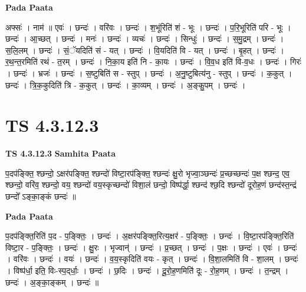 \documentclass[17pt]{extarticle}
\begin{document}
\textbf{Pada Paata} \newline

अफ्सः॑ । नाम॑ ॥ एवः॑ । छन्दः॑ । वरि॑वः । छन्दः॑ । श॒भूंरिति॑ शं - भूः । छन्दः॑ । प॒रि॒भूरिति॑ परि - भूः । छन्दः॑ । आ॒च्छत् । छन्दः॑ । मनः॑ । छन्दः॑ । व्यचः॑ । छन्दः॑ । सिन्धुः॑ । छन्दः॑ । स॒मु॒द्रम् । छन्दः॑ । स॒लि॒लम् । छन्दः॑ । सं॒ॅयदिति॑ सं - यत् । छन्दः॑ । वि॒यदिति॑ वि - यत् । छन्दः॑ । बृ॒हत् । छन्दः॑ । र॒थ॒न्त॒रमिति॑ रथं - त॒रम् । छन्दः॑ । नि॒का॒य इति॑ नि - का॒यः । छन्दः॑ । वि॒व॒ध इति॑ वि-व॒धः । छन्दः॑ । गिरः॑ । छन्दः॑ । भ्रजः॑ । छन्दः॑ । स॒ष्टुबिति॑ स - स्तुप् । छन्दः॑ । अ॒नु॒ष्टुबित्य॑नु - स्तुप् । छन्दः॑ । क॒कुत् । छन्दः॑ । त्रि॒क॒कुदिति॑ त्रि - क॒कुत् । छन्दः॑ । का॒व्यम् । छन्दः॑ । अ॒ङ्कु॒पम् । छन्दः॑ ।  \newline




\section*{ TS 4.3.12.3 }

\textbf{TS 4.3.12.3 } \newline
\textbf{Samhita Paata} \newline

प॒दप॑ङ्क्ति॒ श्छन्दो॒ ऽक्षर॑पङ्क्ति॒ श्छन्दो॑ विष्टा॒रप॑ङ्क्ति॒ श्छन्दः॑ क्षु॒रो भृज्वा॒ञ्छन्दः॑ प्र॒च्छच्छन्दः॑ प॒क्ष श्छन्द॒ एव॒ श्छन्दो॒ वरि॑व॒ श्छन्दो॒ वय॒ श्छन्दो॑ वय॒स्कृच्छन्दो॑ विशा॒लं छन्दो॒ विष्प॑र्द्धा॒ श्छन्द॑ श्छ॒दि श्छन्दो॑ दूरोह॒णं छन्द॑स्त॒न्द्रं छन्दो᳚ ऽङ्का॒ङ्कं छन्दः॑ ॥ \newline

\textbf{Pada Paata} \newline

प॒दप॑ङ्क्ति॒रिति॑ प॒द - प॒ङ्क्तिः॒ । छन्दः॑ । अ॒क्षर॑पङ्क्ति॒रित्य॒क्षर॑ - प॒ङ्क्तिः॒ । छन्दः॑ । वि॒ष्टा॒रप॑ङ्क्ति॒रिति॑ विष्टा॒र - प॒ङ्क्तिः॒ । छन्दः॑ । क्षु॒रः । भृज्वान्॑ । छन्दः॑ । प्र॒च्छत् । छन्दः॑ । प॒क्षः । छन्दः॑ । एवः॑ । छन्दः॑ । वरि॑वः । छन्दः॑ । वयः॑ । छन्दः॑ । व॒य॒स्कृदिति॑ वयः - कृत् । छन्दः॑ । वि॒शा॒लमिति॑ वि - शा॒लम् । छन्दः॑ । विष्प॑र्धा॒ इति॒ विः-स्प॒द्‌र्धाः॒ । छन्दः॑ । छ॒दिः । छन्दः॑ । दू॒रो॒ह॒णमिति॑ दूः - रो॒ह॒णम् । छन्दः॑ । त॒न्द्रम् । छन्दः॑ । अ॒ङ्का॒ङ्कम् । छन्दः॑ ॥  \newline




\end{document}
